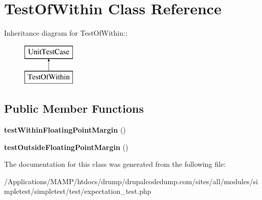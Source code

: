 \hypertarget{class_test_of_within}{
\section{TestOfWithin Class Reference}
\label{class_test_of_within}
}
Inheritance diagram for TestOfWithin::\begin{figure}[H]
\begin{center}
\leavevmode
\includegraphics[height=2cm]{class_test_of_within}
\end{center}
\end{figure}
\subsection*{Public Member Functions}
\begin{DoxyCompactItemize}
\item 
\hypertarget{class_test_of_within_acdd65360583ee68d16deced52734b2f0}{
{\bfseries testWithinFloatingPointMargin} ()}
\label{class_test_of_within_acdd65360583ee68d16deced52734b2f0}

\item 
\hypertarget{class_test_of_within_a875a22b30ee220466c2cb20658cdfc8f}{
{\bfseries testOutsideFloatingPointMargin} ()}
\label{class_test_of_within_a875a22b30ee220466c2cb20658cdfc8f}

\end{DoxyCompactItemize}


The documentation for this class was generated from the following file:\begin{DoxyCompactItemize}
\item 
/Applications/MAMP/htdocs/drump/drupalcodedump.com/sites/all/modules/simpletest/simpletest/test/expectation\_\-test.php\end{DoxyCompactItemize}
